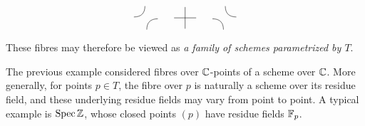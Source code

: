 \begin{example}
\[\begin{tikzpicture}[scale=0.95]
            \begin{scope}[shift={(-1.45,\ytop)}, scale=0.48]
                \draw (-0.07,0.92)
                    .. controls (-0.08,0.36) and (-0.34,0.08)
                    .. (-0.92,0.07);
                \draw (0.07,-0.92)
                    .. controls (0.08,-0.36) and (0.34,-0.08)
                    .. (0.92,-0.07);
            \end{scope}
            
            \begin{scope}[shift={(0,\ytop)}, scale=0.48]
                \draw (-0.85,0) -- (0.85,0);
                \draw (0,-0.85) -- (0,0.85);
            \end{scope}
            
            \begin{scope}[shift={(1.45,\ytop)}, scale=0.48]
                \draw (0.07,0.92)
                    .. controls (0.08,0.36) and (0.34,0.08)
                    .. (0.92,0.07);
                \draw (-0.07,-0.92)
                    .. controls (-0.08,-0.36) and (-0.34,-0.08)
                    .. (-0.92,-0.07);
            \end{scope}
            
        \end{tikzpicture}
    \]
    These fibres may therefore be viewed as \textit{a family of schemes parametrized by $T$}.
\end{example}

The previous example considered fibres over $\mathbb{C}$-points of a scheme over $\mathbb{C}$. More generally, for points $p \in T$, the fibre over $p$ is naturally a scheme over its residue field, and these underlying residue fields may vary from point to point. A typical example is $\operatorname{Spec}\mathbb{Z}$, whose closed points $(p)$ have residue fields $\mathbb{F}_p$.

